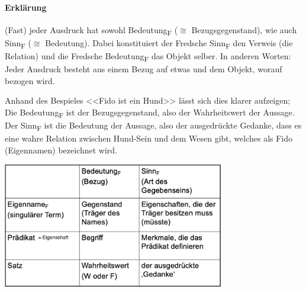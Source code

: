 \documentclass[../main.tex]{subfiles}
\begin{document}
\paragraph{Erklärung} (Fast) jeder Ausdruck hat sowohl Bedeutung\textsubscript{F} ($\cong$ Bezugsgegenstand), wie auch Sinn\textsubscript{F} ($\cong$ Bedeutung). Dabei konstituiert der Fredsche Sinn\textsubscript{F} den Verweis (die Relation) und die Fredsche Bedeutung\textsubscript{F} das Objekt selber. In anderen Worten: Jeder Ausdruck besteht aus einem Bezug auf etwas und dem Objekt, worauf bezogen wird. 

Anhand des Bespieles <<Fido ist ein Hund>> lässt sich dies klarer aufzeigen; Die Bedeutung\textsubscript{F} ist der Bezugsgegenstand, also der Wahrheitswert der Aussage. Der Sinn\textsubscript{F} ist die Bedeutung der Aussage, also der ausgedrückte Gedanke, dass es eine wahre Relation zwischen Hund-Sein und dem Wesen gibt, welches als Fido (Eigennamen) bezeichnet wird.

\vspace{10pt} 
{\centering\includegraphics[height=5.5cm]{images/freges_sinn_und_bedeutung.png}\endcenter}
\end{document}
